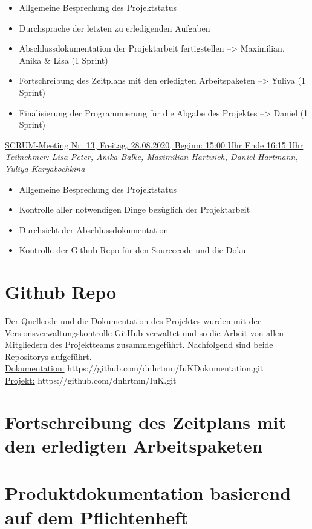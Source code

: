 \documentclass[a4paper,report,headsepline]{scrreprt}
\begin{document}
\begin{itemize}
\item Allgemeine Besprechung des Projektstatus 
\item Durchsprache der letzten zu erledigenden Aufgaben 
\item Abschlussdokumentation der Projektarbeit fertigstellen --> Maximilian, Anika \& Lisa (1 Sprint) 
\item Fortschreibung des Zeitplans mit den erledigten Arbeitspaketen --> Yuliya (1 Sprint) 
\item Finalisierung der Programmierung für die Abgabe des Projektes --> Daniel (1 Sprint) 
\end{itemize}
\underline{{\large SCRUM-Meeting Nr. 13, Freitag, 28.08.2020, Beginn: 15:00 Uhr Ende 16:15 Uhr}} \\
\textit{Teilnehmer: Lisa Peter, Anika Balke, Maximilian Hartwich, Daniel Hartmann, Yuliya Karyabochkina}

\begin{itemize}
\item Allgemeine Besprechung des Projektstatus 
\item Kontrolle aller notwendigen Dinge bezüglich der Projektarbeit 
\item Durchsicht der Abschlussdokumentation 
\item Kontrolle der Github Repo für den Sourcecode und die Doku 
\end{itemize}
     
\chapter{Github Repo}
Der Quellcode und die Dokumentation des Projektes wurden mit der Versionsverwaltungskontrolle GitHub verwaltet und so die Arbeit von allen Mitgliedern des Projektteams zusammengeführt. Nachfolgend sind beide Repositorys aufgeführt. \\
\underline{Dokumentation:} https://github.com/dnhrtmn/IuKDokumentation.git \\
\underline{Projekt:} https://github.com/dnhrtmn/IuK.git
\chapter{Fortschreibung des Zeitplans mit den erledigten Arbeitspaketen}
\chapter{Produktdokumentation basierend auf dem Pflichtenheft}\label{cha:Produktdokumentation}
\end{document}

